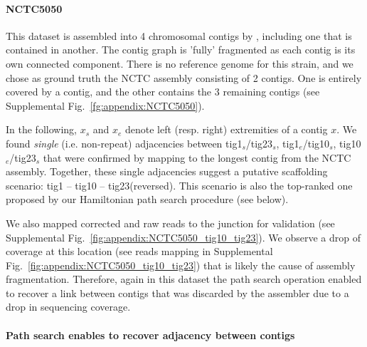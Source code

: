 \documentclass[./main.tex]{subfiles}
\newcommand{\modafterreview}[1]{#1}
\begin{document}
\paragraph{NCTC5050}

This dataset is assembled into 4 chromosomal contigs by \canu, including one that is contained in another. The \canu contig graph is 'fully' fragmented as each contig is its own connected component. There is no reference genome for this strain, and we chose as ground truth the NCTC assembly consisting of 2 contigs. One is entirely covered by a \canu contig, and the other contains the 3 remaining contigs (see Supplemental Fig.~\ref{fg:appendix:NCTC5050}). 
%
\modafterreview{
In the following, $x_s$ and $x_e$ denote left (resp. right) extremities of a contig $x$.
We found \emph{single} (i.e. non-repeat) adjacencies 
between tig1$_s$/tig23$_s$, 
tig1$_e$/tig10$_s$, 
tig10$_e$/tig23$_s$ that were confirmed by mapping to the longest contig from the NCTC assembly. Together, these single adjacencies suggest a putative scaffolding scenario: tig1 -- tig10 -- tig23(reversed). This scenario is also the top-ranked one proposed by our Hamiltonian path search procedure (see below).}

We also mapped corrected and raw reads to the junction for validation (see Supplemental Fig.~\ref{fig:appendix:NCTC5050_tig10_tig23}). We observe a drop of coverage at this location (see reads mapping in Supplemental Fig.~\ref{fig:appendix:NCTC5050_tig10_tig23}) that is likely the cause of assembly fragmentation. Therefore, again in this dataset the path search operation enabled to recover a link between contigs that was discarded by the assembler due to a drop in \modafterreview{sequencing} coverage.

% 

\paragraph{Path search enables to recover adjacency between contigs}
\end{document}
